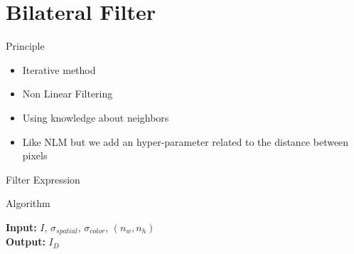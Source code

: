 \section{Bilateral Filter}
\frame{\sectionpage}

\begin{frame}{Principle}

\begin{itemize}
    \item Iterative method
    \item Non Linear Filtering
    \item Using knowledge about neighbors
    \item Like NLM but we add an hyper-parameter related to the distance between pixels
\end{itemize}

\end{frame}

\begin{frame}{Filter Expression}
\end{frame}

\begin{frame}{Algorithm}
\begin{algorithm}[H]
    \caption{Filtering Algorithm} %
    \begin{algorithmic}[1]
        \newline
        \textbf{Input:} $I$, $\sigma_{spatial}$, $\sigma_{color}$, $(n_w, n_h)$ \\
        \textbf{Output:} $I_{D}$
        \EndFor
        \EndProcedure
    \end{algorithmic}
\end{algorithm}
\end{frame}


